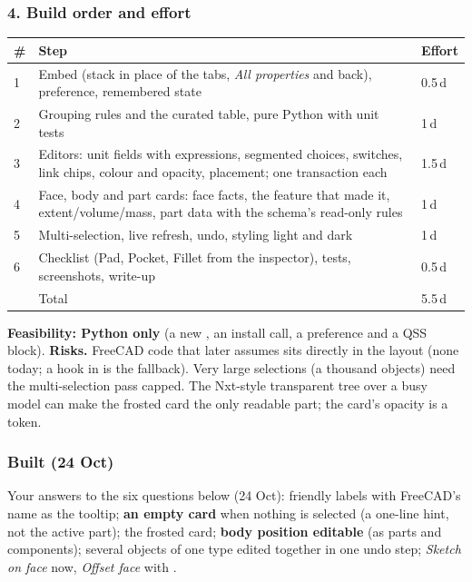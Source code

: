 \subsubsection*{4. Build order and effort}

\begin{center}
\small
\begin{tabularx}{\linewidth}{@{}lXl@{}}
\toprule
\# & Step & Effort\\
\midrule
1 & Embed (stack in place of the tabs, \emph{All properties} and back), preference, remembered state & 0.5\,d\\
2 & Grouping rules and the curated table, pure Python with unit tests & 1\,d\\
3 & Editors: unit fields with expressions, segmented choices, switches, link chips, colour and opacity, placement;
    one transaction each & 1.5\,d\\
4 & Face, body and part cards: face facts, the feature that made it, extent/volume/mass, part data with the
    schema's read-only rules & 1\,d\\
5 & Multi-selection, live refresh, undo, styling light and dark & 1\,d\\
6 & Checklist (Pad, Pocket, Fillet from the inspector), tests, screenshots, write-up & 0.5\,d\\
\midrule
 & Total & 5.5\,d\\
\bottomrule
\end{tabularx}
\end{center}
\textbf{Feasibility: Python only} (a new , an install call, a preference and a QSS
block). \textbf{Risks.} FreeCAD code that later assumes  sits directly in the layout (none today;
a \code{[BW]} hook in  is the fallback). Very large selections (a thousand objects) need the
multi-selection pass capped. The Nxt-style transparent tree over a busy model can make the frosted card the only
readable part; the card's opacity is a token.

\subsubsection*{Built (24 Oct)}

Your answers to the six questions below (24 Oct): friendly labels with FreeCAD's name as the tooltip; \textbf{an
empty card} when nothing is selected (a one-line hint, not the active part); the frosted card; \textbf{body position
editable} (as parts and components); several objects of one type edited together in one undo step; \emph{Sketch on
face} now, \emph{Offset face} with .

